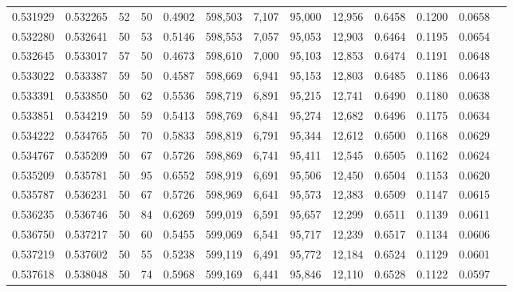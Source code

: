 \begin{tabular}{rrrrrrrrrrrrr}
0.531929 & 0.532265 &    52 &  50 &                                     0.4902 & 598,503 &   7,107 &  95,000 &  12,956 & 0.6458 & 0.1200 & 0.0658 \\
0.532280 & 0.532641 &    50 &  53 &                                     0.5146 & 598,553 &   7,057 &  95,053 &  12,903 & 0.6464 & 0.1195 & 0.0654 \\
0.532645 & 0.533017 &    57 &  50 &                                     0.4673 & 598,610 &   7,000 &  95,103 &  12,853 & 0.6474 & 0.1191 & 0.0648 \\
0.533022 & 0.533387 &    59 &  50 &                                     0.4587 & 598,669 &   6,941 &  95,153 &  12,803 & 0.6485 & 0.1186 & 0.0643 \\
0.533391 & 0.533850 &    50 &  62 &                                     0.5536 & 598,719 &   6,891 &  95,215 &  12,741 & 0.6490 & 0.1180 & 0.0638 \\
0.533851 & 0.534219 &    50 &  59 &                                     0.5413 & 598,769 &   6,841 &  95,274 &  12,682 & 0.6496 & 0.1175 & 0.0634 \\
0.534222 & 0.534765 &    50 &  70 &                                     0.5833 & 598,819 &   6,791 &  95,344 &  12,612 & 0.6500 & 0.1168 & 0.0629 \\
0.534767 & 0.535209 &    50 &  67 &                                     0.5726 & 598,869 &   6,741 &  95,411 &  12,545 & 0.6505 & 0.1162 & 0.0624 \\
0.535209 & 0.535781 &    50 &  95 &                                     0.6552 & 598,919 &   6,691 &  95,506 &  12,450 & 0.6504 & 0.1153 & 0.0620 \\
0.535787 & 0.536231 &    50 &  67 &                                     0.5726 & 598,969 &   6,641 &  95,573 &  12,383 & 0.6509 & 0.1147 & 0.0615 \\
0.536235 & 0.536746 &    50 &  84 &                                     0.6269 & 599,019 &   6,591 &  95,657 &  12,299 & 0.6511 & 0.1139 & 0.0611 \\
0.536750 & 0.537217 &    50 &  60 &                                     0.5455 & 599,069 &   6,541 &  95,717 &  12,239 & 0.6517 & 0.1134 & 0.0606 \\
0.537219 & 0.537602 &    50 &  55 &                                     0.5238 & 599,119 &   6,491 &  95,772 &  12,184 & 0.6524 & 0.1129 & 0.0601 \\
0.537618 & 0.538048 &    50 &  74 &                                     0.5968 & 599,169 &   6,441 &  95,846 &  12,110 & 0.6528 & 0.1122 & 0.0597 \\

\end{tabular}
